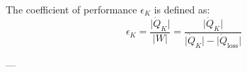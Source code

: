 The coefficient of performance \( \epsilon_K \) is defined as:  
\[
\epsilon_K = \frac{\lvert \dot{Q}_K \rvert}{\lvert W \rvert} = \frac{\lvert \dot{Q}_K \rvert}{\lvert \dot{Q}_K \rvert - \lvert \dot{Q}_{\text{loss}} \rvert}
\]  

---